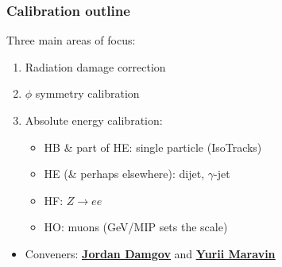 \documentclass[bigger]{beamer}
\providecommand{\alert}[1]{\textbf{#1}}
\begin{document}
\begin{frame}
\frametitle{Calibration outline}
\label{sec-2-1-2}
\begin{block}{Three main areas of focus:}
\label{sec-2-1-2-1}

\begin{enumerate}
\item Radiation damage correction
\item $\phi$ symmetry calibration
\item Absolute energy calibration:
\begin{itemize}
\item HB \& part of HE: single particle (IsoTracks)
\item HE (\& perhaps elsewhere): dijet, $\gamma$-jet
\item HF: $Z\rightarrow ee$
\item HO: muons (GeV/MIP sets the scale)
\end{itemize}
\end{enumerate}
\end{block}
\begin{itemize}

\item Conveners: \href{mailto:jordan.damgov@cern.ch}{\underline{\alert{Jordan Damgov}}} and \href{mailto:yurii.maravin@cern.ch}{\underline{\alert{Yurii Maravin}}}
\label{sec-2-1-2-2}%
\end{itemize} %
\end{frame}
\end{document}

